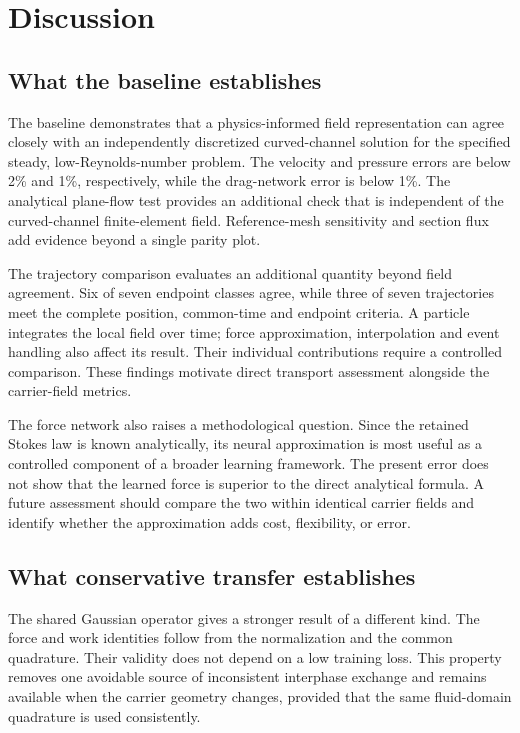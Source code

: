 \chapter{Discussion}\label{ch:discussion}

\section{What the baseline establishes}
The baseline demonstrates that a physics-informed field representation can
agree closely with an independently discretized curved-channel solution
for the specified steady, low-Reynolds-number problem. The velocity and
pressure errors are below 2\% and 1\%, respectively, while the drag-network
error is below 1\%. The analytical plane-flow test provides an additional
check that is independent of the curved-channel finite-element field.
Reference-mesh sensitivity and section flux add evidence beyond a single
parity plot.

The trajectory comparison evaluates an additional quantity beyond field
agreement. Six of seven endpoint classes agree, while three of seven
trajectories meet the complete position, common-time and endpoint criteria.
A particle integrates the local field over time; force approximation,
interpolation and event handling also affect its result. Their individual
contributions require a controlled comparison. These findings motivate
direct transport assessment alongside the carrier-field metrics.

The force network also raises a methodological question. Since the
retained Stokes law is known analytically, its neural approximation is
most useful as a controlled component of a broader learning framework.
The present error does not show that the learned force is superior to the
direct analytical formula. A future assessment should compare the two
within identical carrier fields and identify whether the approximation
adds cost, flexibility, or error.

\section{What conservative transfer establishes}
The shared Gaussian operator gives a stronger result of a different kind.
The force and work identities follow from the normalization and the common
quadrature. Their validity does not depend on a low training loss. This
property removes one avoidable source of inconsistent interphase exchange
and remains available when the carrier geometry changes, provided that the
same fluid-domain quadrature is used consistently.

